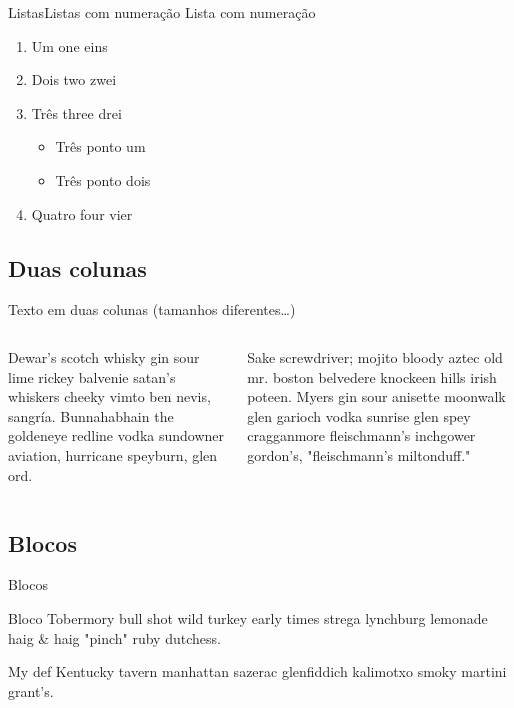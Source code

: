 \documentclass[
	brazilian, %
	14pt, %
]{beamer}
\begin{document}
\begin{frame}{Listas}{Listas com numeração}
	Lista com numeração
	
	\begin{enumerate}
		\item Um one eins
		\item Dois two zwei
		\item Três three drei
			\begin{itemize}
				\item Três ponto um
				\item Três ponto dois
			\end{itemize}
		\item Quatro four vier
	\end{enumerate}
\end{frame}

\subsection{Duas colunas}

\begin{frame}
	Texto em duas colunas (tamanhos diferentes\ldots)
	
	\vspace{1em}
	\begin{columns}[t]
		\begin{column}{0.4\linewidth}
			Dewar's scotch whisky gin sour lime rickey balvenie satan's whiskers cheeky vimto ben nevis, sangría. Bunnahabhain the goldeneye redline vodka sundowner aviation, hurricane speyburn, glen ord.
		\end{column}
		\begin{column}{0.6\linewidth}
			 Sake screwdriver; mojito bloody aztec old mr. boston belvedere knockeen hills irish poteen. Myers gin sour anisette moonwalk glen garioch vodka sunrise glen spey cragganmore fleischmann's inchgower gordon's, "fleischmann's miltonduff." 
		\end{column}
	\end{columns}
\end{frame}

\subsection{Blocos}

\begin{frame}{Blocos}
	\begin{block}{Bloco}
		Tobermory bull shot wild turkey early times strega lynchburg lemonade haig \& haig "pinch" ruby dutchess. 
	\end{block}

	\begin{definition}{My def}
		Kentucky tavern manhattan sazerac glenfiddich kalimotxo smoky martini grant's.
	\end{definition}

\end{frame}
\end{document}
